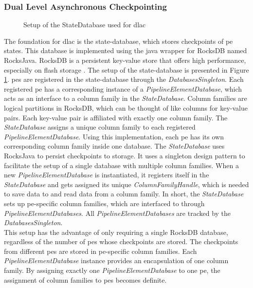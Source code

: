 \subsubsection{Dual Level Asynchronous Checkpointing}
\label{lImplementationDLAC}

\begin{figure}[!b]
    \centering
    \graphicspath{{./figures/code/}}
    
    \caption{Setup of the StateDatabase used for \gls{dlac}}
    \label{fStateDatabaseSetup}
\end{figure}

The foundation for \gls{dlac} is the state-database, which stores checkpoints of \gls{pe} states. This database is implemented using the java wrapper for RocksDB named RocksJava. RocksDB is a persistent key-value store that offers high performance, especially on flash storage \cite{zhichaoCao.2020}. The setup of the state-database is presented in Figure \ref{fStateDatabaseSetup}. \gls{pe}s are registered in the state-database through the \textit{DatabasesSingleton}. Each registered \gls{pe} has a corresponding instance of a \textit{PipelineElementDatabase}, which acts as an interface to a column family in the \textit{StateDatabase}. Column families are logical partitions in RocksDB, which can be thought of like columns for key-value pairs. Each key-value pair is affiliated with exactly one column family. The \textit{StateDatabase} assigns a unique column family to each registered \textit{PipelineElementDatabase}. Using this implementation, each \gls{pe} has its own corresponding column family inside one database. The \textit{StateDatabase} uses RocksJava to persist checkpoints to storage. It uses a singleton design pattern to facilitate the setup of a single database with multiple column families. When a new \textit{PipelineElementDatabase} is instantiated, it registers itself in the \textit{StateDatabase} and gets assigned its unique \textit{ColumnFamilyHandle}, which is needed to save data to and read data from a column family. In short, the \textit{StateDatabase} sets up \gls{pe}-specific column families, which are interfaced to through \textit{PipelineElementDatabases}. All \textit{PipelineElementDatabases} are tracked by the \textit{DatabasesSingleton}.\\
This setup has the advantage of only requiring a single RocksDB database, regardless of the number of \gls{pe}s whose checkpoints are stored. The checkpoints from different \gls{pe}s are stored in \gls{pe}-specific column families. Each \textit{PipelineElementDatabase} instance provides an encapsulation of one column family. By assigning exactly one \textit{PipelineElementDatabase} to one \gls{pe}, the assignment of column families to \gls{pe}s becomes definite.\par


